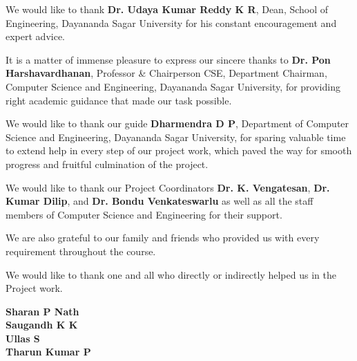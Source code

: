 \documentclass[12pt,a4paper]{report}
\begin{document}
We would like to thank \textbf{Dr. Udaya Kumar Reddy K R}, Dean, School of Engineering, Dayananda Sagar University for his constant encouragement and expert advice.

It is a matter of immense pleasure to express our sincere thanks to \textbf{Dr. Pon Harshavardhanan}, Professor \& Chairperson CSE, Department Chairman, Computer Science and Engineering, Dayananda Sagar University, for providing right academic guidance that made our task possible.

We would like to thank our guide \textbf{Dharmendra D P}, Department of Computer Science and Engineering, Dayananda Sagar University, for sparing valuable time to extend help in every step of our project work, which paved the way for smooth progress and fruitful culmination of the project.

We would like to thank our Project Coordinators \textbf{Dr. K. Vengatesan}, \textbf{Dr. Kumar Dilip}, and \textbf{Dr. Bondu Venkateswarlu} as well as all the staff members of Computer Science and Engineering for their support.

We are also grateful to our family and friends who provided us with every requirement throughout the course.

We would like to thank one and all who directly or indirectly helped us in the Project work.

\vspace{22pt}
\begin{flushright}
\textbf{Sharan P Nath}\\
\textbf{Saugandh K K}\\
\textbf{Ullas S}\\
\textbf{Tharun Kumar P}
\end{flushright}
\newpage

\tableofcontents
\newpage

\listoffigures
{}
\newpage

\listoftables
{}
\newpage
\end{document}
